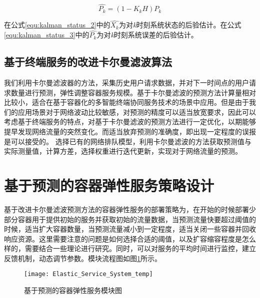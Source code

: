 \begin{equation}\label{equ:kalman_status_3}
    \widehat{P_k}=(1-K_kH)P_k
\end{equation}

在公式\ref{equ:kalman_status_2}中的$\widehat{X_k}$为对\emph{k}时刻系统状态的后验估计。在公式\ref{equ:kalman_status_3}中的$\widehat{P_k}$为对\emph{k}时刻系统误差的后验估计。

\subsection{基于终端服务的改进卡尔曼滤波算法}

我们利用卡尔曼滤波器的方法，采集历史用户请求数据，并对下一时间点的用户请求数量进行预测，弹性调整容器服务规模。基于卡尔曼滤波的预测方法计算量相对比较小，适合在基于容器化的多智能终端协同服务技术的场景中应用。但是由于我们的应用场景对于网络波动比较敏感，对预测的精度可以适当放宽要求，因此可以考虑基于终端服务的特点，对基于卡尔曼滤波的预测方法进行一定优化，以期能够提早发现网络流量的突然变化。而适当放弃预测的准确度，即出现一定程度的误报是可以接受的。
选择已有的网络排队模型，利用卡尔曼滤波的方法获取预测值与实际测量值，计算方差，选择权重进行迭代更新，实现对于网络流量的预测。



\section{基于预测的容器弹性服务策略设计}\label{sec:elastic_service_strategy}

基于改进卡尔曼滤波预测方法的容器弹性服务的部署策略为，在开始的时候部署少部分容器用于提供初始的服务并获取初始的流量数据，当预测流量快要超过阈值的时候，适当扩大容器数量，当预测流量减小到一定程度，适当关闭一些容器并回收响应资源。这里需要注意的问题是如何选择合适的阈值，以及扩容缩容程度是怎么样的，需要结合一些理论进行研究。同时，可以对服务的平均时间进行监控，建立反馈机制，动态调节参数。模块流程图如图\ref{fig:elastic_service_system}所示。

\begin{figure}[htbp]
    \centering
    \texttt{[image: Elastic\_Service\_System\_temp]}\hfill\\[0.5cm]
  \caption{基于预测的容器弹性服务模块图}
  \label{fig:elastic_service_system}
  \end{figure}


